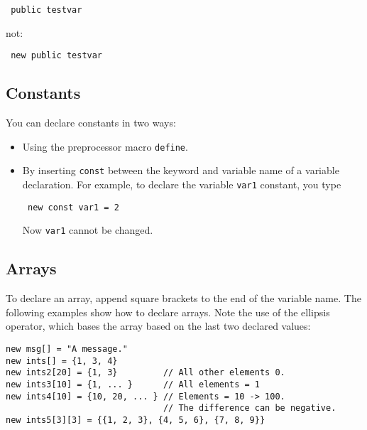 \begin{Code}\begin{verbatim} public testvar 
\end{verbatim}
\end{Code}

 not: 

\begin{Code}\begin{verbatim} new public testvar 
\end{verbatim}
\end{Code}

\hypertarget{Small_Page_Small_Constants_Subsection}{}\subsection{Constants}\label{Small_Page_Small_Constants_Subsection}
You can declare constants in two ways: \begin{itemize}
\item Using the preprocessor macro {\tt define}. \item By inserting {\tt const} between the keyword and variable name of a variable declaration. For example, to declare the variable {\tt var1} constant, you type 

\begin{Code}\begin{verbatim} new const var1 = 2 
\end{verbatim}
\end{Code}

 Now {\tt var1} cannot be changed.\end{itemize}
\hypertarget{Small_Page_Small_Arrays_Subsection}{}\subsection{Arrays}\label{Small_Page_Small_Arrays_Subsection}
To declare an array, append square brackets to the end of the variable name. The following examples show how to declare arrays. Note the use of the ellipsis operator, which bases the array based on the last two declared values:



\begin{Code}\begin{verbatim}new msg[] = "A message."
new ints[] = {1, 3, 4}
new ints2[20] = {1, 3}         // All other elements 0.
new ints3[10] = {1, ... }      // All elements = 1
new ints4[10] = {10, 20, ... } // Elements = 10 -> 100.
                               // The difference can be negative.
new ints5[3][3] = {{1, 2, 3}, {4, 5, 6}, {7, 8, 9}}
\end{verbatim}
\end{Code}




